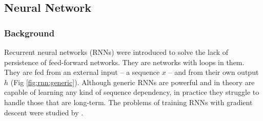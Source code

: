 \subsection{Neural Network}\label{sec:nn}

\subsubsection{Background}

Recurrent neural networks (RNNs) were introduced to solve the lack of persistence of feed-forward networks. They are networks with loops in them. They are fed from an external input -- a sequence $x$ -- and from their own output $h$ (Fig \ref{fig:rnn:generic}). Although generic RNNs are powerful and in theory are capable of learning any kind of sequence dependency, in practice they struggle to handle those that are long-term. The problems of training RNNs with gradient descent were studied by .

